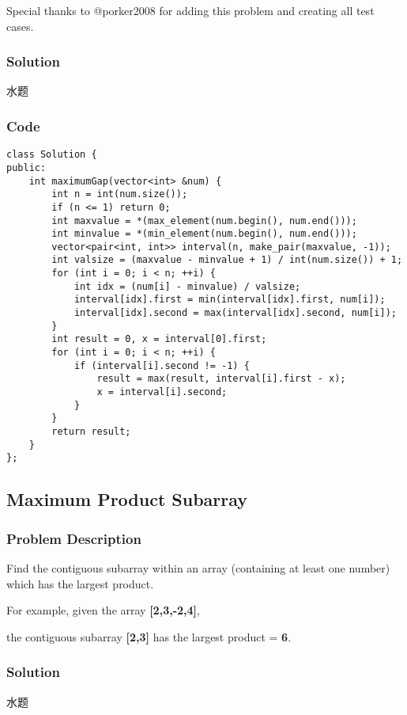 \documentclass[courier]{article}
\begin{document}
\begin{CJK*}{UTF8}{gkai}
Special thanks to @porker2008 for adding this problem and creating all test cases.



\subsubsection*{Solution}
水题

\subsubsection*{Code}
\begin{lstlisting}
class Solution {
public:
    int maximumGap(vector<int> &num) {
        int n = int(num.size());
        if (n <= 1) return 0;
        int maxvalue = *(max_element(num.begin(), num.end()));
        int minvalue = *(min_element(num.begin(), num.end()));
        vector<pair<int, int>> interval(n, make_pair(maxvalue, -1));
        int valsize = (maxvalue - minvalue + 1) / int(num.size()) + 1;
        for (int i = 0; i < n; ++i) {
            int idx = (num[i] - minvalue) / valsize;
            interval[idx].first = min(interval[idx].first, num[i]);
            interval[idx].second = max(interval[idx].second, num[i]);
        }
        int result = 0, x = interval[0].first;
        for (int i = 0; i < n; ++i) {
            if (interval[i].second != -1) {
                result = max(result, interval[i].first - x);
                x = interval[i].second;
            }
        }
        return result;
    }
}; 
\end{lstlisting}


\subsection{ Maximum Product Subarray }

\subsubsection*{Problem Description}
Find the contiguous subarray within an array (containing at least one number) which has the largest product.

For example, given the array \textbf{[2,3,-2,4]},


the contiguous subarray \textbf{[2,3]} has the largest product = \textbf{6}.



\subsubsection*{Solution}
水题


\end{CJK*}
\end{document}
